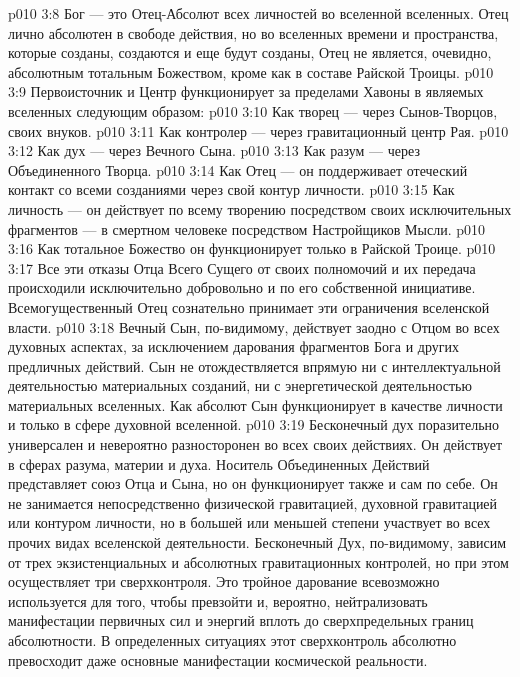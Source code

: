 \vs p010 3:8 Бог --- это Отец\hyp{}Абсолют всех личностей во вселенной вселенных. Отец лично абсолютен в свободе действия, но во вселенных времени и пространства, которые созданы, создаются и еще будут созданы, Отец не является, очевидно, абсолютным тотальным Божеством, кроме как в составе Райской Троицы.
\vs p010 3:9 \pc Первоисточник и Центр функционирует за пределами Хавоны в являемых вселенных следующим образом:
\vs p010 3:10 \bibnobreakspace Как творец --- через Сынов\hyp{}Творцов, своих внуков.
\vs p010 3:11 \bibnobreakspace Как контролер --- через гравитационный центр Рая.
\vs p010 3:12 \bibnobreakspace Как дух --- через Вечного Сына.
\vs p010 3:13 \bibnobreakspace Как разум --- через Объединенного Творца.
\vs p010 3:14 \bibnobreakspace Как Отец --- он поддерживает отеческий контакт со всеми созданиями через свой контур личности.
\vs p010 3:15 \bibnobreakspace Как личность --- он действует  по всему творению посредством своих исключительных фрагментов --- в смертном человеке посредством Настройщиков Мысли.
\vs p010 3:16 \bibnobreakspace Как тотальное Божество он функционирует только в Райской Троице.
\vs p010 3:17 \pc Все эти отказы Отца Всего Сущего от своих полномочий и их передача происходили исключительно добровольно и по его собственной инициативе. Всемогущественный Отец сознательно принимает эти ограничения вселенской власти.
\vs p010 3:18 \pc Вечный Сын, по\hyp{}видимому, действует заодно с Отцом во всех духовных аспектах, за исключением дарования фрагментов Бога и других предличных действий. Сын не отождествляется впрямую ни с интеллектуальной деятельностью материальных созданий, ни с энергетической деятельностью материальных вселенных. Как абсолют Сын функционирует в качестве личности и только в сфере духовной вселенной.
\vs p010 3:19 \pc Бесконечный дух поразительно универсален и невероятно разносторонен во всех своих действиях. Он действует в сферах разума, материи и духа. Носитель Объединенных Действий представляет союз Отца и Сына, но он функционирует также и сам по себе. Он не занимается непосредственно физической гравитацией, духовной гравитацией или контуром личности, но в большей или меньшей степени участвует во всех прочих видах вселенской деятельности. Бесконечный Дух, по\hyp{}видимому, зависим от трех экзистенциальных и абсолютных гравитационных контролей, но при этом осуществляет три сверхконтроля. Это тройное дарование всевозможно используется для того, чтобы превзойти и, вероятно, нейтрализовать манифестации первичных сил и энергий вплоть до сверхпредельных границ абсолютности. В определенных ситуациях этот сверхконтроль абсолютно превосходит даже основные манифестации космической реальности.
